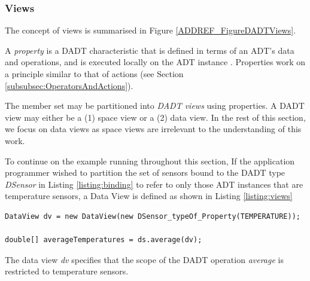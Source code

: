 \subsubsection{Views}

The concept of views is summarised in Figure \ref{ADDREF_FigureDADTViews}.

A \emph{property} is a DADT characteristic that is defined in terms of an ADT's
data and operations, and is executed locally on the ADT instance
\cite{migliavacca_DADT:2006}. Properties work on a principle similar to that of
actions (see Section \ref{subsubsec:OperatorsAndActions}).

The member set may be partitioned into \emph{DADT views} using properties. A
DADT view may either be a (1) space view or a (2) data view. In the rest of this
section, we focus on data views as space views are irrelevant to the
understanding of this work. 

To continue on the example running throughout this section, If the application
programmer wished to partition the set of sensors bound to the DADT type
\emph{DSensor} in Listing \ref{listing:binding} to refer to only those ADT
instances that are temperature sensors, a Data View is defined as shown in Listing
\ref{listing:views} 
  
\begin{lstlisting}[frame=trbl, basewidth={0.55em, 0.6em}, captionpos=b, 
basicstyle=\ttfamily\footnotesize, breaklines, caption = Definition and use of DADT Data View, label = listing:views ]  
DataView dv = new DataView(new DSensor_typeOf_Property(TEMPERATURE));

double[] averageTemperatures = ds.average(dv);
\end{lstlisting}

The data view \emph{dv} specifies that the scope of the DADT operation
\emph{average} is restricted to temperature sensors.


